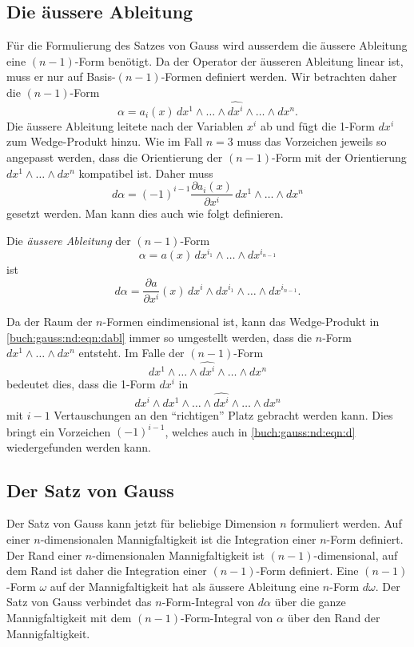 %
%
\subsection{Die äussere Ableitung}
Für die Formulierung des Satzes von Gauss wird ausserdem die
äussere Ableitung eine $(n-1)$-Form benötigt.
Da der Operator der äusseren Ableitung linear ist, muss er nur
auf Basis-$(n-1)$-Formen definiert werden.
Wir betrachten daher die $(n-1)$-Form
\[
\alpha
=
a_i(x)\, dx^1\wedge\dots\wedge \widehat{dx^i}\wedge\dots\wedge dx^n.
\]
Die äussere Ableitung leitete nach der Variablen $x^i$ ab und fügt
die 1-Form $dx^i$ zum Wedge-Produkt hinzu.
Wie im Fall $n=3$ muss das Vorzeichen jeweils so angepasst werden,
dass die Orientierung der $(n-1)$-Form mit der Orientierung
$dx^1\wedge\dots\wedge dx^n$ kompatibel ist.
Daher muss
\begin{equation}
d\alpha
=
(-1)^{i-1}
\frac{\partial a_i(x)}{\partial x^i}
\,
dx^1\wedge\dots\wedge dx^n
\label{buch:gauss:nd:eqn:d}
\end{equation}
gesetzt werden.
Man kann dies auch wie folgt definieren.

\begin{definition}
Die {\em äussere Ableitung} der $(n-1)$-Form
\[
\alpha = a(x)\, dx^{i_1}\wedge\dots\wedge dx^{i_{n-1}}
\]
ist
\begin{equation}
d\alpha
=
\frac{\partial a}{\partial x^i}(x)
\,dx^i
\wedge dx^{i_1}\wedge\dots\wedge dx^{i_{n-1}}.
\label{buch:gauss:nd:eqn:dabl}
\end{equation}
\end{definition}

Da der Raum der $n$-Formen eindimensional ist, kann 
das Wedge-Produkt in \eqref{buch:gauss:nd:eqn:dabl}
immer so umgestellt werden, dass die $n$-Form
$dx^1\wedge\dots\wedge dx^n$ entsteht.
Im Falle der $(n-1)$-Form
\[
dx^1\wedge\dots\wedge\widehat{dx^i}\wedge\dots\wedge dx^n
\]
bedeutet dies, dass die 1-Form $dx^i$ in
\[
dx^i
\wedge
dx^1\wedge\dots\wedge\widehat{dx^i}\wedge\dots\wedge dx^n
\]
mit $i-1$ Vertauschungen an den ``richtigen'' Platz gebracht
werden kann.
Dies bringt ein Vorzeichen $(-1)^{i-1}$, welches auch in
\eqref{buch:gauss:nd:eqn:d}
wiedergefunden werden kann.

%
%
\subsection{Der Satz von Gauss
\label{buch:gauss:gauss:subsection:satzvongauss}}
Der Satz von Gauss kann jetzt für beliebige Dimension $n$ formuliert
werden.
Auf einer $n$-dimensionalen Mannigfaltigkeit ist die Integration
einer $n$-Form definiert.
Der Rand einer $n$-dimensionalen Mannigfaltigkeit ist $(n-1)$-dimensional,
auf dem Rand ist daher die Integration einer $(n-1)$-Form definiert.
Eine $(n-1)$-Form $\omega$ auf der Mannigfaltigkeit hat als äussere 
Ableitung eine $n$-Form $d\omega$.
Der Satz von Gauss verbindet das $n$-Form-Integral von $d\alpha$
über die ganze Mannigfaltigkeit mit dem $(n-1)$-Form-Integral von $\alpha$
über den Rand der Mannigfaltigkeit.

